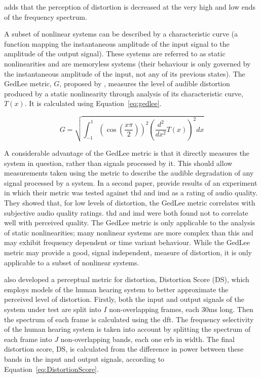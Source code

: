 			\citet{voishvillo2006assessment} adds that the perception of distortion is decreased at the very
			high and low ends of the frequency spectrum.

			A subset of nonlinear systems can be described by a characteristic curve (a function mapping the
			instantaneous amplitude of the input signal to the amplitude of the output signal). These systems
			are referred to as static nonlinearities and are memoryless systems (their behaviour is only
			governed by the instantaneous amplitude of the input, not any of its previous states). The GedLee
			metric, $G$, proposed by \citet{geddes2003auditory}, measures the level of audible distortion
			produced by a static nonlinearity through analysis of its characteristic curve, $T(x)$. It is
			calculated using Equation~\ref{eq:gedlee}.

			\begin{equation}
				G = \sqrt{\int_{-1}^{1} \left( \cos \left( \frac{x\pi}{2} \right) \right)^{2}
					      \left( \frac{d^{2}}{dx^{2}} T(x) \right)^{2} dx}
				\label{eq:gedlee}
			\end{equation}

			A considerable advantage of the GedLee metric is that it directly measures the system in question,
			rather than signals processed by it. This should allow measurements taken using the metric to
			describe the audible degradation of any signal processed by a system. In a second paper,
			\citet{lee2003auditory} provide results of an experiment in which their metric was tested against
			\acrshort{thd} and \acrshort{imd} as a rating of audio quality. They showed that, for low levels of
			distortion, the GedLee metric correlates with subjective audio quality ratings. \acrshort{thd} and
			\acrshort{imd} were both found not to correlate well with perceived quality. The GedLee metric is
			only applicable to the analysis of static nonlinearities; many nonlinear systems are more complex
			than this and may exhibit frequency dependent or time variant behaviour. While the GedLee metric
			may provide a good, signal independent, measure of distortion, it is only applicable to a subset of
			nonlinear systems.

			\citet{tan2003the} also developed a perceptual metric for distortion, Distortion Score
			($\mathrm{DS}$), which employs models of the human hearing system to better approximate the
			perceived level of distortion. Firstly, both the input and output signals of the system under test
			are split into $I$ non-overlapping frames, each 30ms long. Then the spectrum of each frame is
			calculated using the \acrshort{dft}. The frequency selectivity of the human hearing system is taken
			into account by splitting the spectrum of each frame into $J$ non-overlapping bands, each one
			\acrshort{erb} in width. The final distortion score, $\mathrm{DS}$, is calculated from the
			difference in power between these bands in the input and output signals, according to
			Equation~\ref{eq:DistortionScore}.

